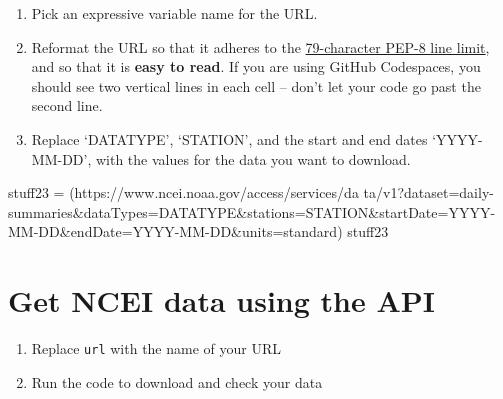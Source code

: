 \documentclass[
  letterpaper,
  DIV=11,
  numbers=noendperiod,
  oneside]{scrreprt}
\newenvironment{Shaded}{\begin{snugshade}}{\end{snugshade}}
\newcommand{\NormalTok}[1]{\textcolor[rgb]{0.00,0.23,0.31}{#1}}
\newcommand{\OperatorTok}[1]{\textcolor[rgb]{0.37,0.37,0.37}{#1}}
\newcommand{\StringTok}[1]{\textcolor[rgb]{0.13,0.47,0.30}{#1}}
\providecommand{\tightlist}{%
  \setlength{\itemsep}{0pt}\setlength{\parskip}{0pt}}
\begin{document}
\begin{tcolorbox}[enhanced jigsaw, colbacktitle=quarto-callout-color!10!white, opacityback=0, bottomtitle=1mm, toptitle=1mm, bottomrule=.15mm, left=2mm, colframe=quarto-callout-color-frame, leftrule=.75mm, opacitybacktitle=0.6, colback=white, rightrule=.15mm, toprule=.15mm, breakable, titlerule=0mm, title=\textcolor{quarto-callout-color}{\faInfo}\hspace{0.5em}{Try It: Format your URL for readability}, coltitle=black, arc=.35mm]

\begin{enumerate}
\def\labelenumi{\arabic{enumi}.}
\tightlist
\item
  Pick an expressive variable name for the URL.
\item
  Reformat the URL so that it adheres to the
  \href{https://peps.python.org/pep-0008/\#maximum-line-length}{79-character
  PEP-8 line limit}, and so that it is \textbf{easy to read}. If you are
  using GitHub Codespaces, you should see two vertical lines in each
  cell -- don't let your code go past the second line.
\item
  Replace `DATATYPE', `STATION', and the start and end dates
  `YYYY-MM-DD', with the values for the data you want to download.
\end{enumerate}

\end{tcolorbox}

\begin{Shaded}
\begin{Highlighting}[]
\NormalTok{stuff23 }\OperatorTok{=}\NormalTok{ (}\StringTok{\textquotesingle{}https://www.ncei.noaa.gov/access/services/da\textquotesingle{}}
\StringTok{\textquotesingle{}ta/v1?dataset=daily{-}summaries\&dataTypes=DATATYPE\&stations=STATION\&startDate=YYYY{-}MM{-}DD\&endDate=YYYY{-}MM{-}DD\&units=standard\textquotesingle{}}\NormalTok{)}
\NormalTok{stuff23}
\end{Highlighting}
\end{Shaded}

\section{Get NCEI data using the
API}\label{get-ncei-data-using-the-api-1}

\begin{tcolorbox}[enhanced jigsaw, colbacktitle=quarto-callout-color!10!white, opacityback=0, bottomtitle=1mm, toptitle=1mm, bottomrule=.15mm, left=2mm, colframe=quarto-callout-color-frame, leftrule=.75mm, opacitybacktitle=0.6, colback=white, rightrule=.15mm, toprule=.15mm, breakable, titlerule=0mm, title=\textcolor{quarto-callout-color}{\faInfo}\hspace{0.5em}{Try It}, coltitle=black, arc=.35mm]

\begin{enumerate}
\def\labelenumi{\arabic{enumi}.}
\tightlist
\item
  Replace \texttt{url} with the name of your URL
\item
  Run the code to download and check your data
\end{enumerate}

\end{tcolorbox}
\end{document}
